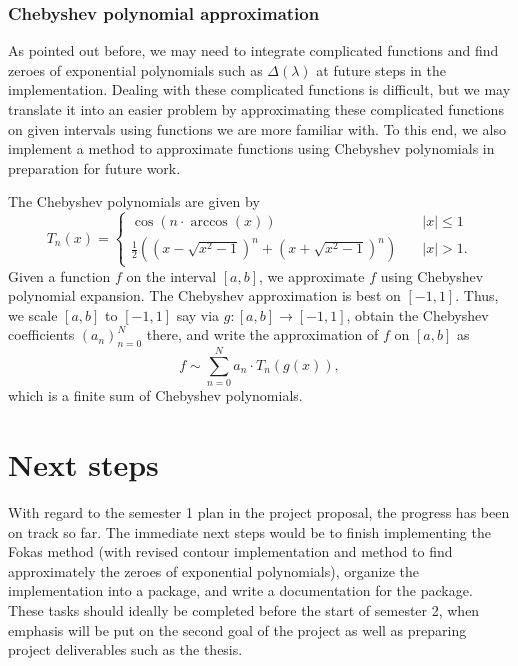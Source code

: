 \documentclass[11pt, oneside, a4paper]{article}
\begin{document}
\subsubsection{Chebyshev polynomial approximation}
As pointed out before, we may need to integrate complicated functions and find zeroes of exponential polynomials such as $\Delta(\lambda)$ at future steps in the implementation. Dealing with these complicated functions is difficult, but we may translate it into an easier problem by approximating these complicated functions on given intervals using functions we are more familiar with. To this end, we also implement a method to approximate functions using Chebyshev polynomials in preparation for future work.

The Chebyshev polynomials are given by
\[
    T_n(x) =
\begin{cases}
    \cos(n\cdot \arccos(x))&\quad\mbox{$|x|\leq 1$}\\
    \frac{1}{2}\left((x-\sqrt{x^2-1})^n + (x+\sqrt{x^2-1})^n\right)&\quad\mbox{$|x|>1$}.
\end{cases}    
\]
Given a function $f$ on the interval $[a,b]$, we approximate $f$ using Chebyshev polynomial expansion. The Chebyshev approximation is best on $[-1,1]$. Thus, we scale $[a,b]$ to $[-1,1]$ say via $g:[a,b]\to [-1,1]$, obtain the Chebyshev coefficients $(a_n)_{n=0}^N$ there, and write the approximation of $f$ on $[a,b]$ as
\[f\sim \sum_{n=0}^N a_n\cdot T_n(g(x)),\]
which is a finite sum of Chebyshev polynomials.

\section{Next steps}
With regard to the semester 1 plan in the project proposal, the progress has been on track so far. The immediate next steps would be to finish implementing the Fokas method (with revised contour implementation and method to find approximately the zeroes of exponential polynomials), organize the implementation into a package, and write a documentation for the package. These tasks should ideally be completed before the start of semester 2, when emphasis will be put on the second goal of the project as well as preparing project deliverables such as the thesis.


\newpage

% 

\end{document}
